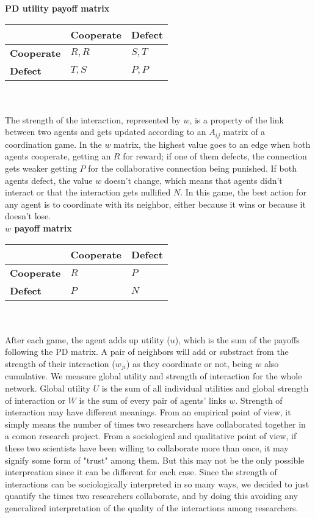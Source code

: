 \documentclass{bmcart}
\begin{document}
{\bf PD utility payoff matrix}\\

\begin{tabular}{| l | l | l |}
\hline
          & \bf{Cooperate} & \bf{Defect} \\ \hline
\bf{Cooperate} &  $R,R$      &  $S,T$   \\ \hline
\bf{Defect}    &  $T,S$      &  $P,P$   \\ \hline

\end{tabular}\\ \\

The strength of the interaction, represented by $w$, is a property of the link between two agents and
gets updated according to an $A_{ij}$ matrix of a coordination game. In the $w$ matrix, the highest value
goes to an edge when both agents cooperate, getting an $R$ for reward; if one of
them defects, the connection gets weaker getting $P$ for the collaborative
connection being punished. If both agents defect, the value $w$ doesn't change,
which means that agents didn't interact or that the interaction gets nullified
$N$. In this game, the best action for any agent is to coordinate with its
neighbor, either because it wins or because it doesn't lose. \\ 

{\bf $w$ payoff matrix}\\

\begin{tabular}{| l | l | l |}
\hline
          & \bf{Cooperate} & \bf{Defect} \\ \hline
\bf{Cooperate} &  $R$      &  $P$   \\ \hline
\bf{Defect}    &  $P$      &  $N$   \\ \hline

\end{tabular}\\ \\


After each game, the agent adds up utility ($u$), which is the sum of the
payoffs following the PD matrix. A pair of neighbors will add or substract from the strength of
their interaction ($w_{ji}$) as they coordinate or not, being $w$
also cumulative. We measure global utility and strength of interaction for the whole
network. Global utility $U$ is the sum of all individual utilities and global
strength of interaction or $W$ is the sum of every pair of agents' links
$w$. Strength of interaction may have different meanings. From an empirical point of view, it simply means the number of times two researchers have collaborated together in a comon research project. From a sociological and qualitative point of view, if these two scientists have been willing to collaborate more than once, it may signify some form of "trust" among them. But this may not be the only possible interpreation since it can be different for each case. Since the strength of interactions can be sociologically interpreted in so many ways, we decided to just quantify the  times two researchers collaborate, and by doing this avoiding any generalized interpretation of the quality of the interactions among researchers. \\
\end{document}

